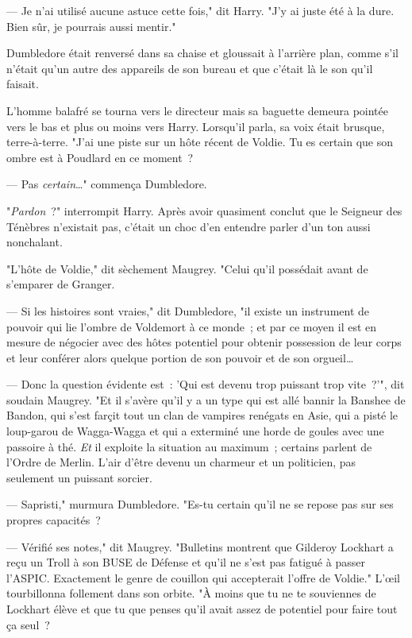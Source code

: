 --- Je n'ai utilisé aucune astuce cette fois," dit Harry. "J'y ai juste été à la dure. Bien sûr, je pourrais aussi mentir."

Dumbledore était renversé dans sa chaise et gloussait à l'arrière plan, comme s'il n'était qu'un autre des appareils de son bureau et que c'était là le son qu'il faisait.

L'homme balafré se tourna vers le directeur mais sa baguette demeura pointée vers le bas et plus ou moins vers Harry. Lorsqu'il parla, sa voix était brusque, terre-à-terre. "J'ai une piste sur un hôte récent de Voldie. Tu es certain que son ombre est à Poudlard en ce moment~?

--- Pas \emph{certain}…" commença Dumbledore.

"\emph{Pardon}~?" interrompit Harry. Après avoir quasiment conclut que le Seigneur des Ténèbres n'existait pas, c'était un choc d'en entendre parler d'un ton aussi nonchalant.

"L'hôte de Voldie," dit sèchement Maugrey. "Celui qu'il possédait avant de s'emparer de Granger.

--- Si les histoires sont vraies," dit Dumbledore, "il existe un instrument de pouvoir qui lie l'ombre de Voldemort à ce monde~; et par ce moyen il est en mesure de négocier avec des hôtes potentiel pour obtenir possession de leur corps et leur conférer alors quelque portion de son pouvoir et de son orgueil…

--- Donc la question évidente est~: 'Qui est devenu trop puissant trop vite~?'", dit soudain Maugrey. "Et il s'avère qu'il y a un type qui est allé bannir la Banshee de Bandon, qui s'est farçit tout un clan de vampires renégats en Asie, qui a pisté le loup-garou de Wagga-Wagga et qui a exterminé une horde de goules avec une passoire à thé. \emph{Et} il exploite la situation au maximum~; certains parlent de l'Ordre de Merlin. L'air d'être devenu un charmeur et un politicien, pas seulement un puissant sorcier.

--- Sapristi," murmura Dumbledore. "Es-tu certain qu'il ne se repose pas sur ses propres capacités~?

--- Vérifié ses notes," dit Maugrey. "Bulletins montrent que Gilderoy Lockhart a reçu un Troll à son BUSE de Défense et qu'il ne s'est pas fatigué à passer l'ASPIC. Exactement le genre de couillon qui accepterait l'offre de Voldie." L'œil tourbillonna follement dans son orbite. "À moins que tu ne te souviennes de Lockhart élève et que tu que penses qu'il avait assez de potentiel pour faire tout ça seul~?

